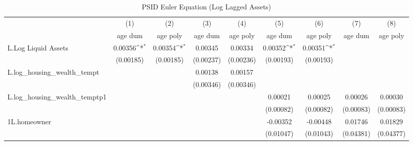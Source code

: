 {
\def\sym#1{\ifmmode^{#1}\else\(^{#1}\)\fi}
\begin{longtable}{l*{8}{c}}
\caption{PSID Euler Equation (Log Lagged Assets)}\\
\toprule\endfirsthead\midrule\endhead\midrule\endfoot\endlastfoot
                    &\multicolumn{1}{c}{(1)}&\multicolumn{1}{c}{(2)}&\multicolumn{1}{c}{(3)}&\multicolumn{1}{c}{(4)}&\multicolumn{1}{c}{(5)}&\multicolumn{1}{c}{(6)}&\multicolumn{1}{c}{(7)}&\multicolumn{1}{c}{(8)}\\
                    &\multicolumn{1}{c}{age dum}&\multicolumn{1}{c}{age poly}&\multicolumn{1}{c}{age dum}&\multicolumn{1}{c}{age poly}&\multicolumn{1}{c}{age dum}&\multicolumn{1}{c}{age poly}&\multicolumn{1}{c}{age dum}&\multicolumn{1}{c}{age poly}\\
\midrule
L.Log Liquid Assets &     0.00356\sym{*}  &     0.00354\sym{*}  &     0.00345         &     0.00334         &     0.00352\sym{*}  &     0.00351\sym{*}  &                     &                     \\
                    &   (0.00185)         &   (0.00185)         &   (0.00237)         &   (0.00236)         &   (0.00193)         &   (0.00193)         &                     &                     \\
\addlinespace
L.log\_housing\_wealth\_tempt&                     &                     &     0.00138         &     0.00157         &                     &                     &                     &                     \\
                    &                     &                     &   (0.00346)         &   (0.00346)         &                     &                     &                     &                     \\
\addlinespace
L.log\_housing\_wealth\_temptp1&                     &                     &                     &                     &     0.00021         &     0.00025         &     0.00026         &     0.00030         \\
                    &                     &                     &                     &                     &   (0.00082)         &   (0.00082)         &   (0.00083)         &   (0.00083)         \\
\addlinespace
1L.homeowner        &                     &                     &                     &                     &    -0.00352         &    -0.00448         &     0.01746         &     0.01829         \\
                    &                     &                     &                     &                     &   (0.01047)         &   (0.01043)         &   (0.04381)         &   (0.04377)         \\

\end{longtable}}
